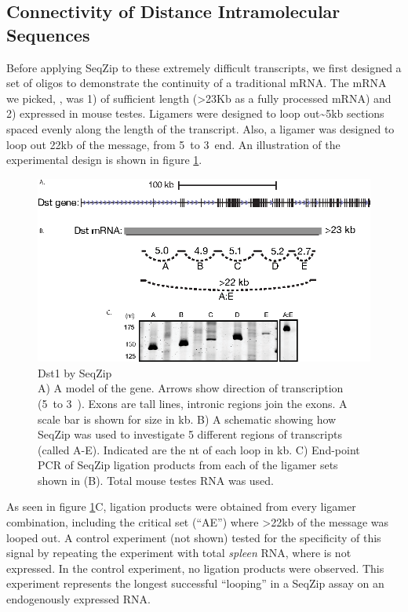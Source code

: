   \subsection{Connectivity of Distance Intramolecular Sequences}
    \label{SeqZipMethod:subsec:SeqZip on long RNAs at multiple locations}

    Before applying SeqZip to these extremely difficult transcripts, we first designed a set of oligos to demonstrate the continuity of a traditional mRNA. The mRNA we picked, \dst{}, was 1) of sufficient length (>23Kb as a fully processed mRNA) and 2) expressed in mouse testes. Ligamers were designed to loop out\textasciitilde5kb sections spaced evenly along the length of the transcript. Also, a ligamer was designed to loop out 22kb of the message, from 5\textprime~to 3\textprime~end. An illustration of the experimental design is shown in figure \ref{SeqZipMethod:fig:SeqZip on dst1}.

    \begin{figure} %
      \centering 
      \includegraphics{Figures/SeqZipMethod/dst1.eps}
      \caption[Dst1 by SeqZip]
      {
        Dst1 by SeqZip\\[0.25cm]
        A) A model of the \dst{} gene. Arrows show direction of transcription (5\textprime~to 3\textprime~). Exons are tall lines, intronic regions join the exons. A scale bar is shown for size in kb. B) A schematic showing how SeqZip was used to investigate 5 different regions of \dst{} transcripts (called A-E). Indicated are the nt of each loop in kb. C) End-point PCR of SeqZip ligation products from each of the ligamer sets shown in (B). Total mouse testes RNA was used.
        }
      \label{SeqZipMethod:fig:SeqZip on dst1}
      \end{figure}

    As seen in figure \ref{SeqZipMethod:fig:SeqZip on dst1}C, ligation products were obtained from every ligamer combination, including the critical set (``AE'') where >22kb of the message was looped out. A control experiment (not shown) tested for the specificity of this signal by repeating the experiment with total \textit{spleen} RNA, where \dst{} is not expressed. In the control experiment, no ligation products were observed. This experiment represents the longest successful ``looping'' in a SeqZip assay on an endogenously expressed RNA. 

